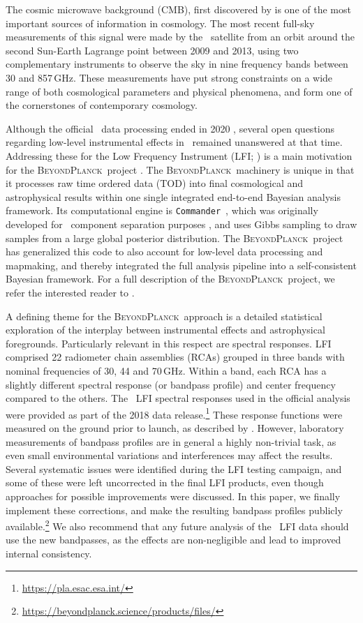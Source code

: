 \documentclass[twocolumn]{aa}
\def\commander{\texttt{Commander}}
\newcommand{\BP}{\textsc{BeyondPlanck}}
\newcommand{\?}[1]{\textcolor{red}{{\bf [#1]}}}
\begin{document}
The cosmic microwave background (CMB), first discovered by
\citet{penzias:1965} is one of the most important sources of
information in cosmology. The most recent full-sky measurements of
this signal were made by the \Planck\ satellite \citep{planck2016-l01}
from an orbit around the second Sun-Earth Lagrange point between 2009
and 2013, using two complementary instruments to observe the sky in
nine frequency bands between 30 and 857\,GHz. These measurements have
put strong constraints on a wide range of both cosmological parameters
and physical phenomena, and form one of the cornerstones of
contemporary cosmology.

Although the official \Planck\ data processing ended in 2020
\citep{planck2016-l01,npipe}, several open questions regarding low-level
instrumental effects in \Planck\ remained unanswered at that time. Addressing
these for the Low Frequency Instrument (LFI; \citealp{planck2016-l02}) is a main
motivation for the \BP\ project \citep{bp01}. The \BP\ machinery is unique in
that it processes raw time ordered data (TOD) into final cosmological and
astrophysical results within one single integrated end-to-end Bayesian analysis
framework. Its computational engine is \commander\
\citep{eriksen:2004,eriksen2008,bp03}, which was originally developed for
\Planck\ component separation purposes
\citep{planck2013-p06,planck2014-a12,planck2016-l04}, and uses Gibbs sampling
\citep{geman:1984} to draw samples from a large global posterior distribution.
The \BP\ project has generalized this code to also account for low-level data
processing and mapmaking, and thereby integrated the full analysis pipeline into
a self-consistent Bayesian framework. For a full description of the \BP\
project, we refer the interested reader to \citet{bp01}.

A defining theme for the \BP\ approach is a detailed statistical exploration of
the interplay between instrumental effects and astrophysical foregrounds.
Particularly relevant in this respect are spectral responses. LFI comprised 22
radiometer chain assemblies (RCAs) grouped in three bands with nominal
frequencies of 30, 44 and 70\,GHz. Within a band, each RCA has a slightly
different spectral response (or bandpass profile) and center frequency compared
to the others. The \Planck\ LFI spectral responses used in the official analysis
were provided as part of the 2018 data
release.\footnote{\url{https://pla.esac.esa.int/}} These response functions were
measured on the ground prior to launch, as described by \citet{zonca2009}.
However, laboratory measurements of bandpass profiles are in general a highly
non-trivial task, as even small environmental variations and interferences may
affect the results. Several systematic issues were identified during the LFI
testing campaign, and some of these were left uncorrected in the final LFI
products, even though approaches for possible improvements were discussed. In
this paper, we finally implement these corrections, and make the resulting
bandpass profiles publicly
available.\footnote{\url{https://beyondplanck.science/products/files/}} We also
recommend that any future analysis of the \Planck\ LFI data should use the new
bandpasses, as the effects are non-negligible and lead to improved internal
consistency.
\end{document}
